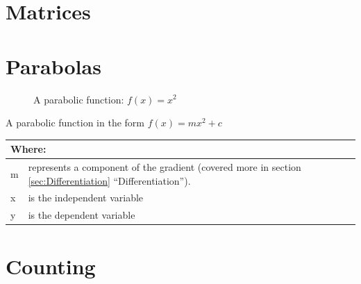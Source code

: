 \section{Matrices}
\label{sec:Matrices}
\lipsum[1]
\section{Parabolas}
\label{sec:Parabolas}
\begin{figure}[!hbt]
\label{fig:FuncGraphParabola}
\caption{A parabolic function: $f(x) = {x}^{2}$}
\end{figure}
A parabolic function in the form $ f(x) = mx^2 + c$
\begin{table}[!hbt]
\label{tab:PartsOfAParabolicFunction}
\begin{tabularx}{\linewidth}{| l X |}
  \hline
  \multicolumn{2}{|l|}{Where:} \\
  \hline \hline
  m & represents a component of the gradient (covered more in section
  \ref{sec:Differentiation} ``Differentiation''). \\ x & is the independent
  variable\\ y & is the dependent variable\\
\hline
\end{tabularx}
\end{table}
%
%
\section{Counting}
\label{sec:Counting}

